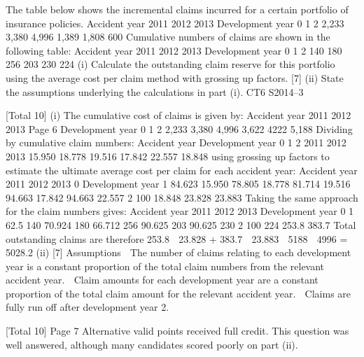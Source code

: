 \documentclass[a4paper,12pt]{article}
\begin{document}

The table below shows the incremental claims incurred for a certain portfolio of
insurance policies.
Accident year
2011
2012
2013
Development year
0
1
2
2,233
3,380
4,996
1,389
1,808
600
Cumulative numbers of claims are shown in the following table:
Accident year
2011
2012
2013
Development year
0
1
2
140
180
256
203
230
224
(i) Calculate the outstanding claim reserve for this portfolio using the average
cost per claim method with grossing up factors.
[7]
(ii) State the assumptions underlying the calculations in part (i).
CT6 S2014–3

[Total 10]
(i)
The cumulative cost of claims is given by:
Accident year
2011
2012
2013
Page 6
Development year
0
1
2
2,233
3,380
4,996
3,622 4222
5,188%
Dividing by cumulative claim numbers:
Accident year
Development year
0
1
2
2011
2012
2013
15.950
18.778
19.516
17.842
22.557
18.848
using grossing up factors to estimate the ultimate average cost per claim for
each accident year:
Accident
year
2011
2012
2013
0
Development year
1
84.623%
15.950
78.805%
18.778
81.714%
19.516
94.663%
17.842
94.663%
22.557
2
100%
18.848
23.828
23.883
Taking the same approach for the claim numbers gives:
Accident
year
2011
2012
2013
Development year
0
1
62.5%
140
70.924%
180
66.712%
256
90.625%
203
90.625%
230
2
100%
224
253.8
383.7
Total outstanding claims are therefore
253.8  23.828 + 383.7  23.883  5188  4996
= 5028.2
(ii)
[7]
Assumptions
 The number of claims relating to each development year is a constant
proportion of the total claim numbers from the relevant accident year.
 Claim amounts for each development year are a constant proportion of the
total claim amount for the relevant accident year.
 Claims are fully run off after development year 2.

[Total 10]
Page 7%
Alternative valid points received full credit. This question was well answered, although many
candidates scored poorly on part (ii).
\end{document}
